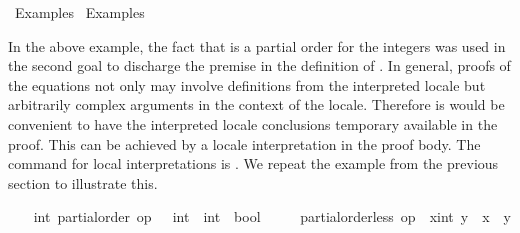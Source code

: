 %
\begin{isabellebody}%
\def\isabellecontext{Examples{\isadigit{3}}}%
%
\isadelimtheory
%
\endisadelimtheory
%
\isatagtheory
{}\isamarkupfalse%
\ Examples{}\isanewline
{}\ Examples\isanewline
{}%
\endisatagtheory
{\isafoldtheory}%
%
\isadelimtheory
%
\endisadelimtheory
%
\begin{isamarkuptext}%
\vspace{-5ex}%
\end{isamarkuptext}%
\isamarkuptrue%
%
\isamarkuptrue%
%
\begin{isamarkuptext}%
In the above example, the fact that  is a partial
  order for the integers was used in the second goal to
  discharge the premise in the definition of .  In
  general, proofs of the equations not only may involve definitions
  from the interpreted locale but arbitrarily complex arguments in the
  context of the locale.  Therefore is would be convenient to have the
  interpreted locale conclusions temporary available in the proof.
  This can be achieved by a locale interpretation in the proof body.
  The command for local interpretations is .  We
  repeat the example from the previous section to illustrate this.%
\end{isamarkuptext}%
\isamarkuptrue%
%
\isadelimvisible
\ \ %
\endisadelimvisible
%
\isatagvisible
{}\isamarkupfalse%
\ int{}\ partial{}order\ {}op\ {}\ {}{}\ int\ {}\ int\ {}\ bool{}\isanewline
\ \ \ \ \ {}partial{}order{}less\ op\ {}\ {}x{}{}int{}\ y\ {}\ {}x\ {}\ y{}{}\isanewline

\end{isabellebody}
